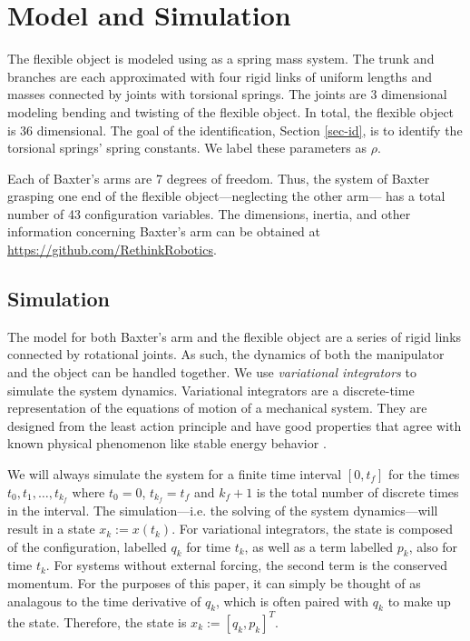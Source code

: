 \documentclass[runningheads,a4paper]{llncs}
\begin{document}
\section{Model and Simulation \label{sec-sim}}
\label{sec-sim}
The flexible object is modeled using as a spring mass system. The trunk and branches are each approximated with four rigid links of uniform lengths and masses connected by joints with torsional springs. The joints are 3 dimensional modeling bending and twisting of the flexible object. In total, the flexible object is 36 dimensional. The goal of the identification, Section \ref{sec-id}, is to identify the torsional springs' spring constants. We label these parameters as $\rho$.

Each of Baxter's arms are 7 degrees of freedom. Thus, the system of Baxter grasping one end of the flexible object---neglecting the other arm--- has a total number of 43 configuration variables. The dimensions,  inertia, and other information concerning Baxter's arm can be obtained at \url{https://github.com/RethinkRobotics}.  

\subsection{Simulation}
The model for both Baxter's arm and the flexible object are a series of rigid links connected by rotational joints. As such, the dynamics of both the manipulator and the object can be handled together. We use \emph{variational integrators} to simulate the system dynamics.   Variational integrators are a discrete-time representation of the equations of motion of a mechanical system.  They are designed from the least action principle and have good properties that agree with known physical phenomenon like stable energy behavior \cite{pekarek_murphey}.  

We will always simulate the system for a finite time interval $[0,t_f]$ for the times $t_0,t_1,\ldots,t_{k_f}$ where $t_0 = 0$, $t_{k_f} = t_f$ and $k_f+1$ is the total number of discrete times in the interval. The simulation---i.e. the solving of the system dynamics---will result in a state $x_k:=x(t_k)$.  For variational integrators, the state is composed of the configuration, labelled $q_k$ for time $t_k$, as well as a term labelled $p_k$, also for time $t_k$. For systems without external forcing, the second term is the conserved momentum.  For the purposes of this paper, it can simply be thought of as analagous to the time derivative of $q_k$, which is often paired with $q_k$ to make up the state.  Therefore, the state is $x_k:=[q_k,p_k]^T$. 
\end{document}

